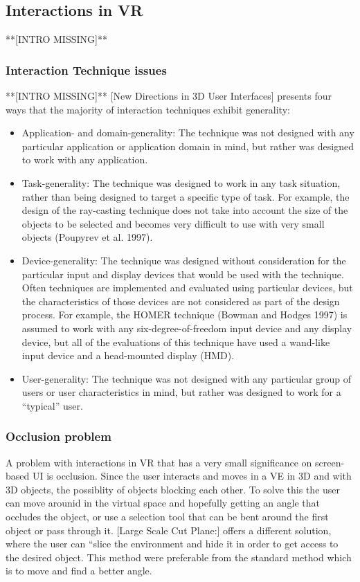 \subsection{Interactions in VR}
**[INTRO MISSING]**
\subsubsection{Interaction Technique issues}
**[INTRO MISSING]**
[New Directions in 3D User Interfaces] presents four ways that the majority of interaction techniques exhibit generality:
\begin{itemize}
  \item Application- and domain-generality: The technique was not designed with any particular application or application domain in mind, but rather was designed to work with any application.
  \item Task-generality: The technique was designed to work in any task situation, rather than being designed to target a specific type of task. For example, the design of the ray-casting technique does not take into account the size of the objects to be selected and becomes very difficult to use with very small objects (Poupyrev et al. 1997).
  \item Device-generality: The technique was designed without consideration for the particular input and display devices that would be used with the technique. Often techniques are implemented and evaluated using particular devices, but the characteristics of those devices are not considered as part of the design process. For example, the HOMER technique (Bowman and Hodges 1997) is assumed to work with any six-degree-of-freedom input device and any display device, but all of the evaluations of this technique have used a wand-like input device and a head-mounted display (HMD).
  \item User-generality: The technique was not designed with any particular group of users or user characteristics in mind, but rather was designed to work for a “typical” user.
\end{itemize}

\subsubsection{Occlusion problem}
A problem with interactions in VR that has a very small significance on screen-based UI is occlusion. Since the user interacts and moves in a VE in 3D and with 3D objects, the possiblity of objects blocking each other. To solve this the user can move arounid in the virtual space and hopefully getting an angle that occludes the object, or use a selection tool that can be bent around the first object or pass through it. [Large Scale Cut Plane:] offers a different solution, where the user can “slice the environment and hide it in order to get access to the desired object.
This method were preferable from the standard method which is to move and find a better angle.
